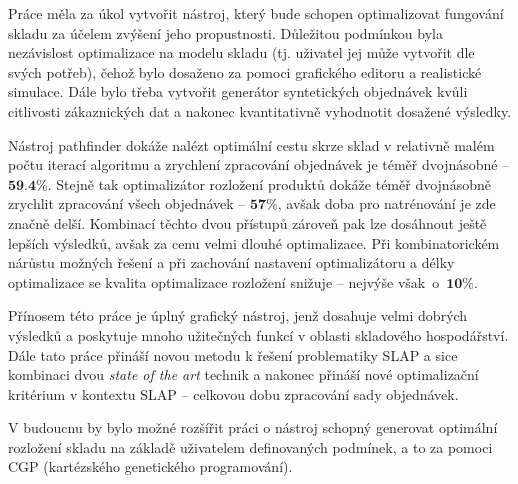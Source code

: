Práce měla za úkol vytvořit nástroj, který bude schopen optimalizovat fungování skladu za účelem zvýšení jeho propustnosti. Důležitou podmínkou byla nezávislost optimalizace na modelu skladu (tj. uživatel jej může vytvořit dle svých potřeb), čehož bylo dosaženo za pomoci grafického editoru a realistické simulace. Dále bylo třeba vytvořit generátor syntetických objednávek kvůli citlivosti zákaznických dat a nakonec kvantitativně vyhodnotit dosažené výsledky.

Nástroj pathfinder dokáže nalézt optimální cestu skrze sklad v relativně malém počtu iterací algoritmu a zrychlení zpracování objednávek je téměř dvojnásobné -- $\textbf{59.4\%}$. Stejně tak optimalizátor rozložení produktů dokáže téměř dvojnásobně zrychlit zpracování všech objednávek -- $\textbf{57\%}$, avšak doba pro natrénování je zde značně delší. Kombinací těchto dvou přístupů zároveň pak lze dosáhnout ještě lepších výsledků, avšak za cenu velmi dlouhé optimalizace. Při kombinatorickém nárůstu možných řešení a při zachování nastavení optimalizátoru a délky optimalizace se kvalita optimalizace rozložení snižuje -- nejvýše však~o~$\textbf{10\%}$.

Přínosem této práce je úplný grafický nástroj, jenž dosahuje velmi dobrých výsledků a poskytuje mnoho užitečných funkcí v oblasti skladového hospodářství. Dále tato práce přináší novou metodu k řešení problematiky SLAP a sice kombinaci dvou \emph{state of the art} technik a nakonec přináší nové optimalizační kritérium v kontextu SLAP -- celkovou dobu zpracování sady objednávek.

V budoucnu by bylo možné rozšířit práci o nástroj schopný generovat optimální rozložení skladu na základě uživatelem definovaných podmínek, a to za pomoci CGP (kartézského genetického programování).